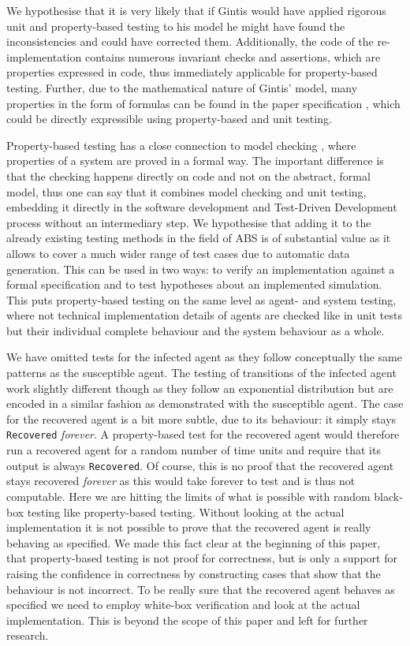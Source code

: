 We hypothesise that it is very likely that if Gintis \cite{gintis_emergence_2006} would have applied rigorous unit and property-based testing to his model he might have found the inconsistencies and could have corrected them. Additionally, the code of the re-implementation \cite{evensen_extensible_2010} contains numerous invariant checks and assertions, which are properties expressed in code, thus immediately applicable for property-based testing. Further, due to the mathematical nature of Gintis' model, many properties in the form of formulas can be found in the paper specification \cite{gintis_emergence_2006}, which could be directly expressible using property-based and unit testing. 

Property-based testing has a close connection to model checking \cite{mcmillan_symbolic_1993}, where properties of a system are proved in a formal way. The important difference is that the checking happens directly on code and not on the abstract, formal model, thus one can say that it combines model checking and unit testing, embedding it directly in the software development and Test-Driven Development process without an intermediary step. We hypothesise that adding it to the already existing testing methods in the field of ABS is of substantial value as it allows to cover a much wider range of test cases due to automatic data generation. This can be used in two ways: to verify an implementation against a formal specification and to test hypotheses about an implemented simulation. This puts property-based testing on the same level as agent- and system testing, where not technical implementation details of agents are checked like in unit tests but their individual complete behaviour and the system behaviour as a whole.

\medskip

We have omitted tests for the infected agent as they follow conceptually the same patterns as the susceptible agent. The testing of transitions of the infected agent work slightly different though as they follow an exponential distribution but are encoded in a similar fashion as demonstrated with the susceptible agent. The case for the recovered agent is a bit more subtle, due to its behaviour: it simply stays \texttt{Recovered} \textit{forever}. A property-based test for the recovered agent would therefore run a recovered agent for a random number of time units and require that its output is always \texttt{Recovered}. Of course, this is no proof that the recovered agent stays recovered \textit{forever} as this would take forever to test and is thus not computable. Here we are hitting the limits of what is possible with random black-box testing like property-based testing. Without looking at the actual implementation it is not possible to prove that the recovered agent is really behaving as specified. We made this fact clear at the beginning of this paper, that property-based testing is not proof for correctness, but is only a support for raising the confidence in correctness by constructing cases that show that the behaviour is not incorrect. To be really sure that the recovered agent behaves as specified we need to employ white-box verification and look at the actual implementation. This is beyond the scope of this paper and left for further research.

